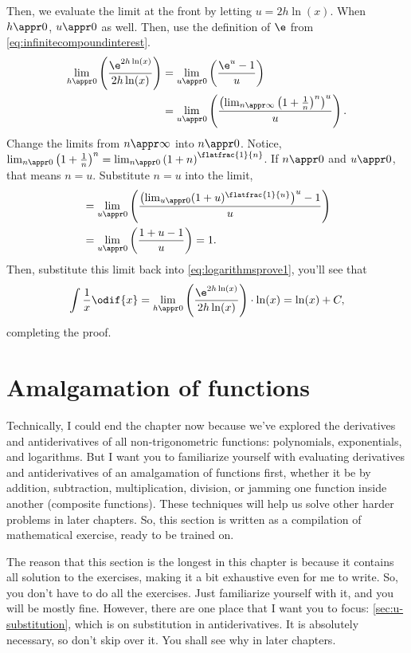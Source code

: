 Then, we evaluate the limit at the front by letting $u = 2h\ln(x)$. When $h \appr 0$, $u \appr 0$ as well. Then, use the definition of $\e$ from \cref{eq:infinitecompoundinterest}.
\begin{align*}
	\lim_{h \appr 0}\left(\frac{\e^{2h\ln(x)}}{2h\ln(x)}\right) & = \lim_{u \appr 0}\left(\frac{\e^u - 1}{u}\right)                                                             \\
	                                                            & = \lim_{u \appr 0}\left(\frac{\left(\lim_{n \appr \infty}\left(1 + \frac{1}{n}\right)^n\right)^u}{u}\right).
\end{align*}
Change the limits from $n \appr \infty$ into $n \appr 0$. Notice, $\lim_{n \appr 0}\left(1 + \frac{1}{n}\right)^n = \lim_{n \appr 0}\left(1 + n\right)^{\flatfrac{1}{n}}$. If $n \appr 0$ and $u \appr 0$, that means $n = u$. Substitute $n = u$ into the limit,
\begin{align*}
	 & = \lim_{u \appr 0}\left(\frac{\left(\lim_{u \appr 0}(1 + u)^{\flatfrac{1}{u}}\right)^u - 1}{u}\right) \\
	 & = \lim_{u \appr 0}\left(\frac{1 + u - 1}{u}\right) = 1.
\end{align*}
Then, substitute this limit back into \cref{eq:logarithmsprove1}, you'll see that
\begin{equation*}
	\int\frac{1}{x}\odif{x} = \lim_{h \appr 0}\left(\frac{\e^{2h\ln(x)}}{2h\ln(x)}\right) \cdot \ln(x) = \ln(x) + C,
\end{equation*}
completing the proof.

\section{Amalgamation of functions}

Technically, I could end the chapter now because we've explored the derivatives and antiderivatives of all non-trigonometric functions: polynomials, exponentials, and logarithms. But I want you to familiarize yourself with evaluating derivatives and antiderivatives of an amalgamation of functions first, whether it be by addition, subtraction, multiplication, division, or jamming one function inside another (composite functions). These techniques will help us solve other harder problems in later chapters. So, this section is written as a compilation of mathematical exercise, ready to be trained on.

The reason that this section is the longest in this chapter is because it contains all solution to the exercises, making it a bit exhaustive even for me to write. So, you don't have to do all the exercises. Just familiarize yourself with it, and you will be mostly fine. However, there are one place that I want you to focus: \cref{sec:u-substitution}, which is on substitution in antiderivatives. It is absolutely necessary, so don't skip over it. You shall see why in later chapters.

